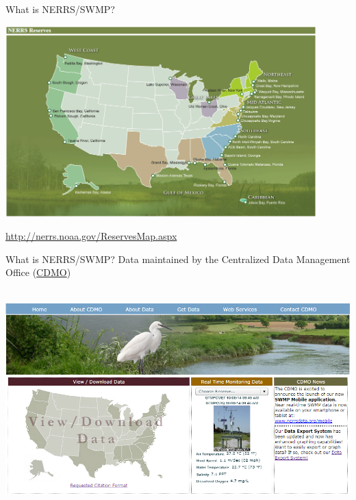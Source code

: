 \documentclass[serif]{beamer}\usepackage[]{graphicx}\usepackage[]{color}
\begin{document}
\begin{frame}{What is NERRS/SWMP?}
\centerline{\includegraphics[width = 0.9\textwidth]{fig/NERRS_locations.png}}
\tiny
\flushright
\href{http://nerrs.noaa.gov/ReservesMap.aspx}{http://nerrs.noaa.gov/ReservesMap.aspx}
\end{frame}

\begin{frame}[t]{What is NERRS/SWMP?}
Data maintained by the Centralized Data Management Office (\href{http://cdmo.baruch.sc.edu/}{CDMO})\\~\\
\centerline{\includegraphics[width = \textwidth]{fig/cdmo_front.png}}
\end{frame}
\end{document}
